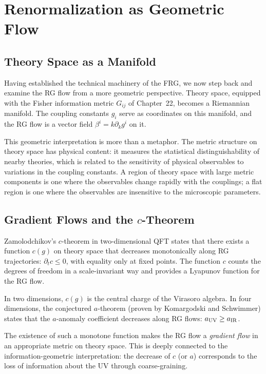 \documentclass[12pt,a4paper,oneside]{book}
\theoremstyle{definition}
\theoremstyle{plain}
\theoremstyle{remark}
\begin{document}
\chapter{Renormalization as Geometric Flow}

\section{Theory Space as a Manifold}

Having established the technical machinery of the FRG, we now step back and
examine the RG flow from a more geometric perspective. Theory space, equipped
with the Fisher information metric $G_{ij}$ of Chapter~22, becomes a
Riemannian manifold. The coupling constants $g_i$ serve as coordinates on
this manifold, and the RG flow is a vector field $\beta^i = k\partial_k g^i$
on it.

This geometric interpretation is more than a metaphor. The metric structure
on theory space has physical content: it measures the statistical
distinguishability of nearby theories, which is related to the sensitivity
of physical observables to variations in the coupling constants. A region of
theory space with large metric components is one where the observables change
rapidly with the couplings; a flat region is one where the observables are
insensitive to the microscopic parameters.

\section{Gradient Flows and the $c$-Theorem}

Zamolodchikov's $c$-theorem in two-dimensional QFT states that there exists a
function $c(g)$ on theory space that decreases monotonically along RG trajectories:
$\partial_t c \leq 0$, with equality only at fixed points. The function $c$
counts the degrees of freedom in a scale-invariant way and provides a Lyapunov
function for the RG flow.

In two dimensions, $c(g)$ is the central charge of the Virasoro algebra.
In four dimensions, the conjectured $a$-theorem (proven by Komargodski and
Schwimmer) states that the $a$-anomaly coefficient decreases along RG flows:
$a_{\rm UV} \geq a_{\rm IR}$.

The existence of such a monotone function makes the RG flow a \emph{gradient flow}
in an appropriate metric on theory space. This is deeply connected to the
information-geometric interpretation: the decrease of $c$ (or $a$) corresponds
to the loss of information about the UV through coarse-graining.
\end{document}
